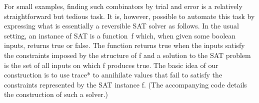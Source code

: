 \documentclass[preprint]{sigplanconf}
\begin{document}




For small examples, finding such combinators by trial and error is a
relatively straightforward but tedious task. It is, however, possible to
automate this task by expressing what is essentially a reversible SAT solver
as follows. In the usual setting, an instance of SAT is a function~{{f}}
which, when given some boolean inputs, returns {{true}} or {{false}}. The
function returns {{true}} when the inputs satisfy the constraints imposed by
the structure of {{f}} and a solution to the SAT problem is the set of all
inputs on which {{f}} produces {{true}}. The basic idea of our construction
is to use {{trace*}} to annihilate values that fail to satisfy the
constraints represented by the SAT instance {{f}}. (The accompanying code
details the construction of such a solver.) 

\end{document}
